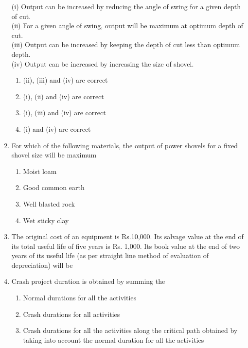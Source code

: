 \documentclass[11pt,a4paper]{article}
\begin{document}
\begin{enumerate}
{ (i) Output can be increased by reducing the angle of swing for a given depth of cut. \\
 (ii) For a given angle of swing, output will be maximum at optimum depth of cut. \\
 (iii) Output can be increased by keeping the depth of cut less than optimum depth. \\
 (iv) Output can be increased by increasing the size of shovel.}
\begin{enumerate}[label=\Alph*.]
\item{(ii), (iii) and (iv) are correct}
\item{(i), (ii) and (iv) are correct}
\item{(i), (iii) and (iv) are correct}
\item{(i) and (iv) are correct}
\end{enumerate}
\item{For which of the following materials, the output of power shovels for a fixed shovel size will be maximum}
\begin{enumerate}[label=\Alph*.]
\item{Moist loam}
\item{Good common earth}
\item{Well blasted rock}
\item{Wet sticky clay}
\end{enumerate}
\item{The original cost of an equipment is Rs.10,000. Its salvage value at the end of its total useful life of five years is Rs. 1,000. Its book value at the end of two years of its useful life (as per straight line method of evaluation of depreciation) will be}
\\
\item{Crash project duration is obtained by summing the}
\begin{enumerate}[label=\Alph*.]
\item{Normal durations for all the activities}
\item{Crash durations for all activities}
\item{Crash durations for all the activities along the critical path obtained by taking into account the normal duration for all the activities}

\end{enumerate}
\end{enumerate}
\end{document}
